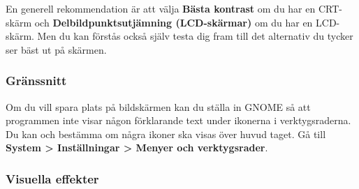 \documentclass[a4paper,final]{memoir} %
\begin{document}
En generell rekommendation är att välja \textbf{Bästa kontrast} om du har en CRT-skärm och \textbf{Delbildpunktsutjämning (LCD-skärmar)} om du har en LCD-skärm. Men du kan förstås också själv testa dig fram till det alternativ du tycker ser bäst ut på skärmen. 


\subsubsection{Gränssnitt}

Om du vill spara plats på bildskärmen kan du ställa in GNOME så att programmen inte visar någon förklarande text under ikonerna i verktygsraderna. Du kan och bestämma om några ikoner ska visas över huvud taget. Gå till  \textbf{System \textgreater{} Inställningar \textgreater{} Menyer och verktygsrader}.


\subsubsection{Visuella effekter}





\end{document}
